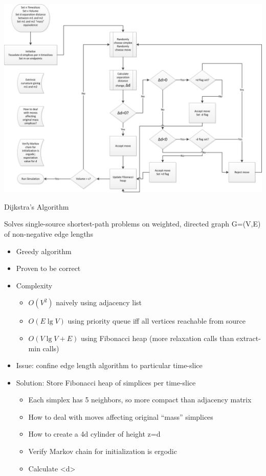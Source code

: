 \documentclass{article}
\begin{document}
\includegraphics[scale=0.35]{Initialization}

Dijkstra's Algorithm \cite{cormen2001introduction}


Solves single-source shortest-path problems on weighted, directed
graph G=(V,E) of non-negative edge lengths

\begin{itemize}
\item Greedy algorithm
\item Proven to be correct
\item Complexity

\begin{itemize}
\item $O(V^{2})$ naively using adjacency list
\item $O(E\lg V)$ using priority queue iff all vertices reachable from
source
\item $O(V\lg V+E)$ using Fibonacci heap (more relaxation calls than extract-min
calls)
\end{itemize}
\item Issue: confine edge length algorithm to particular time-slice
\item Solution: Store Fibonacci heap of simplices per time-slice

\begin{itemize}
\item Each simplex has 5 neighbors, so more compact than adjacency matrix
\end{itemize}

\begin{itemize}
\item How to deal with moves affecting original ``mass'' simplices
\item How to create a 4d cylinder of height z=d
\item Verify Markov chain for initialization is ergodic
\item Calculate <d>
\end{itemize}
\end{itemize}
\end{document}
